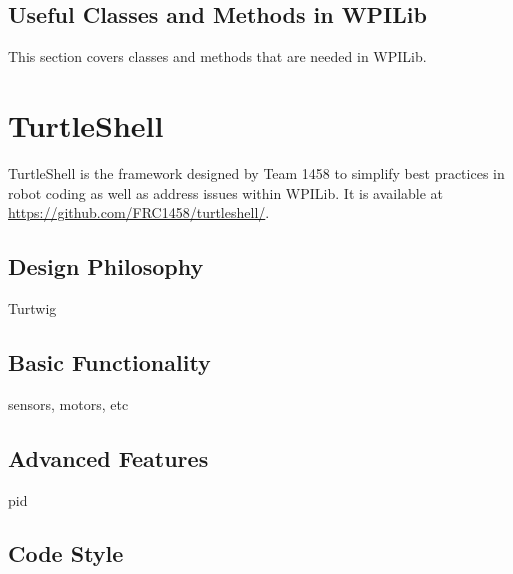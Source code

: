 \documentclass[]{report}
\begin{document}
\section{Useful Classes and Methods in WPILib}
This section covers classes and methods that are needed in WPILib.

\chapter{TurtleShell}
\label{TurtleShell}
TurtleShell is the framework designed by Team 1458 to simplify best practices in robot coding as well as address issues within WPILib.
It is available at \url{https://github.com/FRC1458/turtleshell/}.
\section{Design Philosophy}
Turtwig
\section{Basic Functionality}
sensors, motors, etc
\section{Advanced Features}
pid
\section{Code Style}
\end{document}
